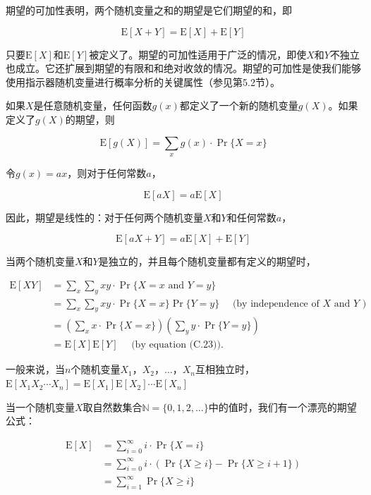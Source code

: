 \documentclass[lang=cn,newtx,10pt,scheme=chinese]{elegantbook}
\begin{document}
期望的可加性表明，两个随机变量之和的期望是它们期望的和，即

$$
\mathrm{E}[X+Y]=\mathrm{E}[X]+\mathrm{E}[Y]
$$

只要$\mathrm{E}[X]$和$\mathrm{E}[Y]$被定义了。期望的可加性适用于广泛的情况，即使$X$和$Y$不独立也成立。它还扩展到期望的有限和和绝对收敛的情况。期望的可加性是使我们能够使用指示器随机变量进行概率分析的关键属性（参见第5.2节）。

如果$X$是任意随机变量，任何函数$g(x)$都定义了一个新的随机变量$g(X)$。如果定义了$g(X)$的期望，则

$$
\mathrm{E}[g(X)]=\sum_x g(x) \cdot \operatorname{Pr}\{X=x\}
$$

令$g(x)=a x$，则对于任何常数$a$，

$$
\mathrm{E}[a X]=a \mathrm{E}[X]
$$

因此，期望是线性的：对于任何两个随机变量$X$和$Y$和任何常数$a$，

$$
\mathrm{E}[a X+Y]=a \mathrm{E}[X]+\mathrm{E}[Y]
$$

当两个随机变量$X$和$Y$是独立的，并且每个随机变量都有定义的期望时，

$$
\begin{aligned}
\mathrm{E}[X Y] & =\sum_x \sum_y x y \cdot \operatorname{Pr}\{X=x \text { and } Y=y\} \\
& =\sum_x \sum_y x y \cdot \operatorname{Pr}\{X=x\} \operatorname{Pr}\{Y=y\} \quad \text { (by independence of } X \text { and } Y \text { ) } \\
& =\left(\sum_x x \cdot \operatorname{Pr}\{X=x\}\right)\left(\sum_y y \cdot \operatorname{Pr}\{Y=y\}\right) \\
& =\mathrm{E}[X] \mathrm{E}[Y] \quad \text { (by equation (C.23)). }
\end{aligned}
$$

一般来说，当$n$个随机变量$X_1，X_2，\ldots，X_n$互相独立时，$\mathrm{E}\left[X_1 X_2 \cdots X_n\right]=\mathrm{E}\left[X_1\right] \mathrm{E}\left[X_2\right] \cdots \mathrm{E}\left[X_n\right]$

当一个随机变量$X$取自然数集合$\mathbb{N}=\{0,1,2, \ldots\}$中的值时，我们有一个漂亮的期望公式：

$$
\begin{aligned}
\mathrm{E}[X] & =\sum_{i=0}^{\infty} i \cdot \operatorname{Pr}\{X=i\} \\
& =\sum_{i=0}^{\infty} i \cdot(\operatorname{Pr}\{X \geq i\}-\operatorname{Pr}\{X \geq i+1\}) \\
& =\sum_{i=1}^{\infty} \operatorname{Pr}\{X \geq i\}
\end{aligned}
$$
\end{document}
